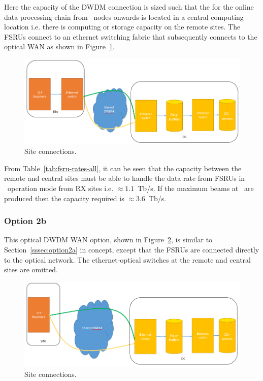 \documentclass[12pt,a4paper]{article}
\begin{document}
Here the capacity of the DWDM connection is sized such that the
\einfra for the 
online data processing chain from \RB\ nodes onwards is located in a central computing location i.e. there is computing or storage capacity on the remote sites.
The FSRUs connect to an ethernet switching fabric that subsequently connects to the optical WAN as shown in Figure~\ref{fig:option_2a}.
\begin{figure}[h]
\centering
\includegraphics[width=\textwidth]{photon_option_2a.png}
\caption{Site connections.\label{fig:option_2a}
}
\end{figure}
From Table~\ref{tab:fsru-rates-all}, it can be seen that the capacity between the remote and central sites must be able to handle the data rate from FSRUs in \WBW\ operation mode from RX sites i.e. $\approx 1.1$~Tb/s.
If the maximum beams at \WBW\ are produced then the capacity required is $\approx 3.6$~Tb/s.


\subsubsection{Option 2b}
\label{sssec:option2b}
This optical DWDM WAN option, shown in Figure~\ref{fig:option_2b}, is similar to Section~\ref{sssec:option2a} in concept, except that the FSRUs are connected directly to the optical network.
The ethernet-optical switches at the remote and central sites are omitted.
\begin{figure}[h]
\centering
\includegraphics[width=\textwidth]{photon_option_2b.png}
\caption{Site connections.\label{fig:option_2b}
}
\end{figure}
\end{document}
